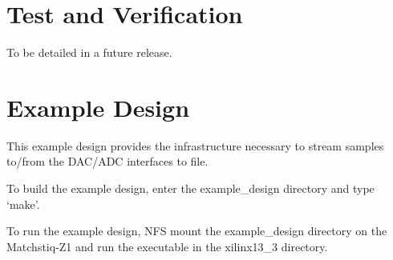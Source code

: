 \documentclass{article}
\begin{document}
\section*{Test and Verification}
\begin{flushleft}
 To be detailed in a future release.
\end{flushleft}
\section*{Example Design}
This example design provides the infrastructure necessary to stream samples to/from the DAC/ADC interfaces to file.\par\medskip

\noindent To build the example design, enter the example\_design directory and type `make'.\par\medskip

\noindent To run the example design, NFS mount the example\_design directory on the Matchstiq-Z1 and run the executable in the xilinx13\_3 directory.\par\bigskip
\end{document}
